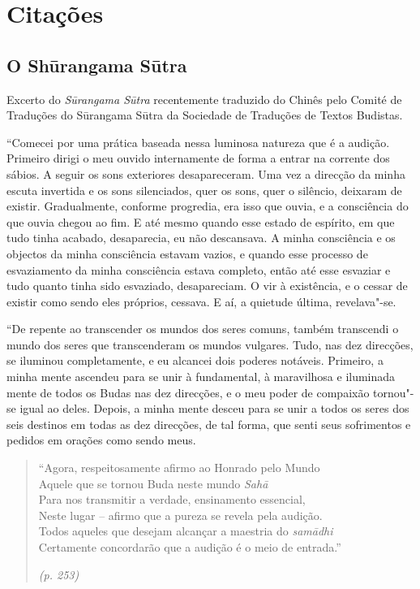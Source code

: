 \chapter{Citações}

\setlength{\parindent}{0pt}
\setlength{\parskip}{0.5\baselineskip}

\section*{O Shūrangama Sūtra}

{\small\itshape

  Excerto do \emph{Sūrangama Sūtra} recentemente traduzido do Chinês pelo Comité
  de Traduções do Sūrangama Sūtra da Sociedade de Traduções de Textos Budistas.
}

\smallskip

``Comecei por uma prática baseada nessa luminosa natureza que é a
audição. Primeiro dirigi o meu ouvido internamente de forma a entrar na
corrente dos sábios. A seguir os sons exteriores desapareceram. Uma vez
a direcção da minha escuta invertida e os sons silenciados, quer os
sons, quer o silêncio, deixaram de existir. Gradualmente, conforme
progredia, era isso que ouvia, e a consciência do que ouvia chegou ao
fim. E até mesmo quando esse estado de espírito, em que tudo tinha
acabado, desaparecia, eu não descansava. A minha consciência e os
objectos da minha consciência estavam vazios, e quando esse processo de
esvaziamento da minha consciência estava completo, então até esse
esvaziar e tudo quanto tinha sido esvaziado, desapareciam. O vir à
existência, e o cessar de existir como sendo eles próprios, cessava. E
aí, a quietude última, revelava"-se.

``De repente ao transcender os mundos dos seres comuns, também
transcendi o mundo dos seres que transcenderam os mundos vulgares. Tudo,
nas dez direcções, se iluminou completamente, e eu alcancei dois poderes
notáveis. Primeiro, a minha mente ascendeu para se unir à fundamental, à
maravilhosa e iluminada mente de todos os Budas nas dez direcções, e o
meu poder de compaixão tornou"-se igual ao deles. Depois, a minha mente
desceu para se unir a todos os seres dos seis destinos em todas as dez
direcções, de tal forma, que senti seus sofrimentos e pedidos em orações
como sendo meus.

\clearpage

\begin{quotation}
``Agora, respeitosamente afirmo ao Honrado pelo Mundo\\
Aquele que se tornou Buda neste mundo \emph{Sahā}\\
Para nos transmitir a verdade, ensinamento essencial,\\
Neste lugar -- afirmo que a pureza se revela pela audição.\\
Todos aqueles que desejam alcançar a maestria do \emph{samādhi}\\
Certamente concordarão que a audição é o meio de entrada.''

\emph{(p. 253)}
\end{quotation}

